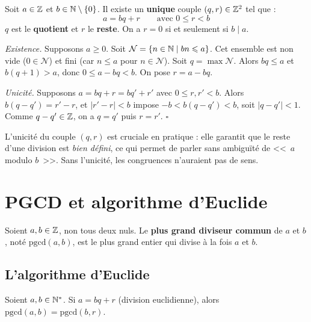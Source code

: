 \begin{thmbox}
Soit $a \in \mathbb{Z}$ et $b \in \mathbb{N} \setminus \{0\}$. Il existe un \textbf{unique} couple $(q, r) \in \mathbb{Z}^2$ tel que :
\[
  a = bq + r \qquad \text{avec } 0 \leqslant r < b
\]
$q$ est le \textbf{quotient} et $r$ le \textbf{reste}. On a $r = 0$ si et seulement si $b \mid a$.
\end{thmbox}

\begin{proofbox}
\textit{Existence.} Supposons $a \geqslant 0$. Soit $\mathcal{N} = \{n \in \mathbb{N} \mid bn \leqslant a\}$. Cet ensemble est non vide ($0 \in \mathcal{N}$) et fini (car $n \leqslant a$ pour $n \in \mathcal{N}$). Soit $q = \max \mathcal{N}$. Alors $bq \leqslant a$ et $b(q+1) > a$, donc $0 \leqslant a - bq < b$. On pose $r = a - bq$.

\textit{Unicité.} Supposons $a = bq + r = bq' + r'$ avec $0 \leqslant r, r' < b$. Alors $b(q - q') = r' - r$, et $|r' - r| < b$ impose $-b < b(q - q') < b$, soit $|q - q'| < 1$. Comme $q - q' \in \mathbb{Z}$, on a $q = q'$ puis $r = r'$. \hfill$\square$
\end{proofbox}

\begin{intuitionbox}
L'unicité du couple $(q, r)$ est cruciale en pratique : elle garantit que le reste d'une division est \emph{bien défini}, ce qui permet de parler sans ambiguïté de <<~$a$ modulo $b$~>>. Sans l'unicité, les congruences n'auraient pas de sens.
\end{intuitionbox}


\section{PGCD et algorithme d'Euclide}

\begin{defbox}[--- PGCD]
Soient $a, b \in \mathbb{Z}$, non tous deux nuls. Le \textbf{plus grand diviseur commun} de $a$ et $b$, noté $\text{pgcd}(a, b)$, est le plus grand entier qui divise à la fois $a$ et $b$.
\end{defbox}

\subsection{L'algorithme d'Euclide}

\begin{lemme}
Soient $a, b \in \mathbb{N}^*$. Si $a = bq + r$ (division euclidienne), alors $\text{pgcd}(a, b) = \text{pgcd}(b, r)$.
\end{lemme}

